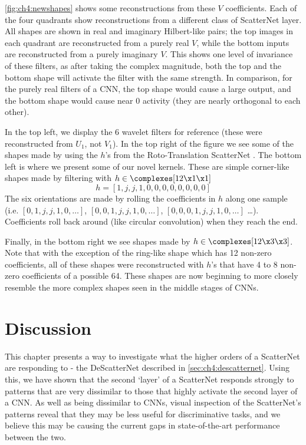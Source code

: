 \autoref{fig:ch4:newshapes} shows some reconstructions from these $V$ coefficients.
Each of the four quadrants show reconstructions from a different class of
ScatterNet layer. 
All shapes are shown in real and imaginary Hilbert-like pairs; the top images in
each quadrant are reconstructed from a purely real $V$, while the bottom inputs
are reconstructed from a purely imaginary $V$. This shows one level of invariance of
these filters, as after taking the complex magnitude, both the top and the
bottom shape will activate the filter with the same strength. In comparison, for
the purely real filters of a CNN, the top shape would cause a large output, and
the bottom shape would cause near 0 activity (they are nearly orthogonal to each
other).

In the top left, we display the 6 wavelet filters for reference (these were
reconstructed from $U_1$, not $V_1$). In the top right of the figure we see some
of the shapes made by using the $h$'s from the Roto-Translation ScatterNet
\cite{sifre_rotation_2013, oyallon_deep_2015}.  The bottom left is where we
present some of our novel kernels. These are simple corner-like shapes made 
by filtering with ${h\in \complexes[12\x 1\x 1]}$
\begin{equation} \label{eq:ch4:simple_corner}
  h = [1, j, j, 1, 0, 0, 0, 0, 0, 0, 0, 0]
\end{equation}
The six orientations are made by rolling the coefficients in $h$ along one
sample (i.e. $[0, 1, j, j, 1, 0,\ldots]$, $[0,0,1,j,j,1,0,\ldots]$,
$[0,0,0,1,j,j,1,0, \ldots]$ \ldots). Coefficients roll back around (like
circular convolution) when they reach the end.

Finally, in the bottom right we see shapes made by 
${h \in \complexes[12\x 3\x 3]}$. Note that with the exception of the 
ring-like shape which has 12 non-zero coefficients, all of these shapes were
reconstructed with $h$'s that have 4 to 8 non-zero coefficients of a possible 
64. These shapes are now beginning to more closely resemble the more complex
shapes seen in the middle stages of CNNs. 

\section{Discussion}
This chapter presents a way to investigate what the higher orders of a ScatterNet
are responding to - the DeScatterNet described in \autoref{sec:ch4:descatternet}.
Using this, we have shown that the second `layer' of a ScatterNet 
responds strongly to patterns that are very dissimilar to those that highly activate the
second layer of a CNN\@. As well as being dissimilar to CNNs, visual inspection of the
ScatterNet's patterns reveal that they may be less useful for discriminative
tasks, and we believe this may be causing the current gaps in state-of-the-art
performance between the two. 

